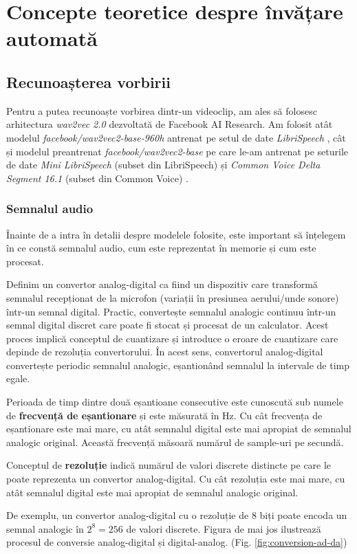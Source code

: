 \chapter{Concepte teoretice despre învățare automată}

\section{Recunoașterea vorbirii}
Pentru a putea recunoaște vorbirea dintr-un videoclip, am ales să folosesc arhitectura
\textit{wav2vec 2.0} \cite{wav2vec2} dezvoltată de Facebook AI Research. Am folosit 
atât modelul \textit{facebook/wav2vec2-base-960h} antrenat pe setul de date 
\textit{LibriSpeech} \cite{librispeech}, cât și modelul preantrenat
\textit{facebook/wav2vec2-base} pe care le-am antrenat pe seturile
de date \textit{Mini LibriSpeech} (subset din LibriSpeech) și
\textit{Common Voice Delta Segment 16.1} (subset din Common Voice) \cite{commonvoice}.
\par

\subsection{Semnalul audio}
\label{subsec:semnal-audio}
Înainte de a intra în detalii despre modelele folosite, este important să înțelegem în 
ce constă semnalul audio, cum este reprezentat în memorie și cum este procesat.

\par
Definim un convertor analog-digital ca fiind un dispozitiv care transformă semnalul recepționat 
de la microfon (variații în presiunea aerului/unde sonore) într-un semnal digital.
Practic, convertește semnalul analogic continuu într-un
semnal digital discret care poate fi stocat și procesat de un calculator. Acest proces implică
conceptul de cuantizare și introduce o eroare de cuantizare care depinde de rezoluția convertorului.
În acest sens, convertorul analog-digital convertește periodic semnalul analogic, eșantionând semnalul
la intervale de timp egale.
\par
Perioada de timp dintre două eșantioane consecutive este cunoscută sub numele de \textbf{frecvență de eșantionare}
și este măsurată în Hz. Cu cât frecvența de eșantionare este mai mare, cu atât semnalul digital este mai apropiat
de semnalul analogic original. Această frecvență măsoară numărul de sample-uri pe secundă.
\par
Conceptul de \textbf{rezoluție} indică numărul de valori discrete distincte pe care le poate 
reprezenta un convertor analog-digital. Cu cât rezoluția este mai mare, cu atât semnalul digital
este mai apropiat de semnalul analogic original.
\par
De exemplu, un convertor analog-digital cu o rezoluție de 8 biți poate encoda un semnal analogic
în $2^8 = 256$ de valori discrete. Figura de mai jos ilustrează procesul de conversie analog-digital
și digital-analog. (Fig. \ref{fig:conversion-ad-da})

